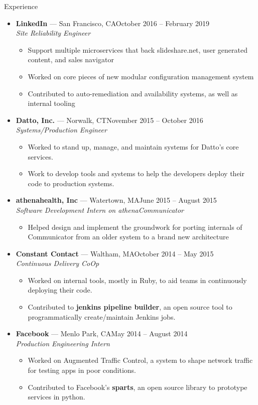 \documentclass[10pt,oneside]{article}
\newenvironment{ressection}[1]{
	\vspace{3pt}
	{\fontfamily{bch}\selectfont\Large#1}
	\begin{itemize}
	\vspace{2pt}
}{
	\end{itemize}
}
\newcommand{\ressubitem}[1]{
	\vspace{-1pt}
	\item \begin{flushleft} #1 \end{flushleft}
}
\newcommand{\resbigitem}[3]{
	\vspace{-3pt}
	\item
	\textbf{#1} --- #2 \\
	\textit{#3}
}
\newenvironment{ressubsec}[3]{
	\resbigitem{#1}{#2}{#3}
	\vspace{-1pt}
	\begin{itemize}
}{
	\end{itemize}
}
\begin{document}
\begin{ressection}{Experience}

	\begin{ressubsec}{LinkedIn}{San Francisco, CA\hfill October 2016 -- February 2019}{Site Reliability Engineer}
		\ressubitem{Support multiple microservices that back slideshare.net, user generated content, and sales navigator}
		\ressubitem{Worked on core pieces of new modular configuration management system}
		\ressubitem{Contributed to auto-remediation and availability systems, as well as internal tooling}
	\end{ressubsec}
	\begin{ressubsec}{Datto, Inc.}{Norwalk, CT\hfill November 2015 -- October 2016}{Systems/Production Engineer}
		\ressubitem{Worked to stand up, manage, and maintain systems for Datto's core services.}
		\ressubitem{Work to develop tools and systems to help the developers deploy their code to production systems.}
	\end{ressubsec}
	\begin{ressubsec}{athenahealth, Inc}{Watertown, MA\hfill June 2015 -- August 2015}{Software Development Intern on athenaCommunicator}
		\ressubitem{Helped design and implement the groundwork for porting internals of Communicator from an older system to a brand new architecture}
	\end{ressubsec}
	\begin{ressubsec}{Constant Contact}{Waltham, MA\hfill October 2014 -- May 2015}{Continuous Delivery CoOp}
		\ressubitem{Worked on internal tools, mostly in Ruby, to aid teams in continuously deploying their code.}
		\ressubitem{Contributed to \textbf{jenkins pipeline builder}, an open source tool to programmatically create/maintain Jenkins jobs.}
	\end{ressubsec}
	\begin{ressubsec}{Facebook}{Menlo Park, CA\hfill May 2014 -- August 2014}{Production Engineering Intern}
		\ressubitem{Worked on Augmented Traffic Control, a system to shape network traffic for testing apps in poor conditions.}
		\ressubitem{Contributed to Facebook's \textbf{sparts}, an open source library to prototype services in python.}
	\end{ressubsec}

\end{ressection}
\end{document}
